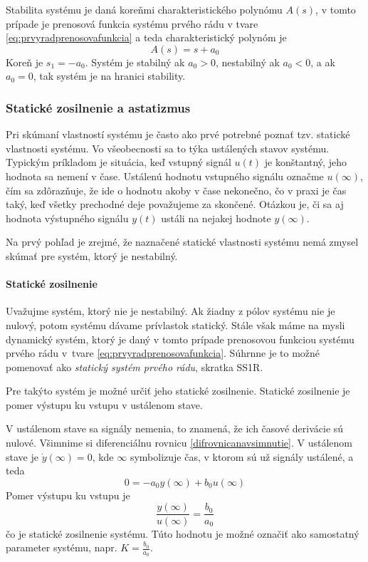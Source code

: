 \documentclass[a4paper, 10pt, ]{article}
\begin{document}
\bigskip

Stabilita systému je daná koreňmi charakteristického polynómu $A(s)$, v tomto prípade je prenosová funkcia systému prvého rádu v tvare \eqref{eq:prvyradprenosovafunkcia} a teda charakteristický polynóm je
\begin{equation}
    A(s) = s + a_0
\end{equation}
Koreň je $s_1 = -a_0$. Systém je stabilný ak $a_0 > 0$, nestabilný ak $a_0 < 0$, a ak $a_0 = 0$, tak systém je na hranici stability.




\subsubsection{Statické zosilnenie a astatizmus}

Pri skúmaní vlastností systému je často ako prvé potrebné poznať tzv. statické vlastnosti systému. Vo všeobecnosti sa to týka ustálených stavov systému. Typickým príkladom je situácia, keď vstupný signál $u(t)$ je konštantný, jeho hodnota sa nemení v čase. Ustálenú hodnotu vstupného signálu označme $u(\infty)$, čím sa zdôrazňuje, že ide o hodnotu akoby v čase nekonečno, čo v praxi je čas taký, keď všetky prechodné deje považujeme za skončené. Otázkou je, či sa aj hodnota výstupného signálu $y(t)$ ustáli na nejakej hodnote $y(\infty)$. 

Na prvý pohľad je zrejmé, že naznačené statické vlastnosti systému nemá zmysel skúmať pre systém, ktorý je nestabilný.



\paragraph{Statické zosilnenie}

Uvažujme systém, ktorý nie je nestabilný. Ak žiadny z pólov systému nie je nulový, potom systému dávame prívlastok statický. Stále však máme na mysli dynamický systém, ktorý je daný v tomto prípade prenosovou funkciou systému prvého rádu v~tvare \eqref{eq:prvyradprenosovafunkcia}. Súhrnne je to možné pomenovať ako \emph{statický systém prvého rádu}, skratka SS1R.

Pre takýto systém je možné určiť jeho statické zosilnenie. Statické zosilnenie je pomer výstupu ku vstupu v ustálenom stave.

V ustálenom stave sa signály nemenia, to znamená, že ich časové derivácie sú nulové. Všimnime si diferenciálnu rovnicu \eqref{difrovnicanavsimnutie}. V ustálenom stave je $\dot y(\infty) = 0$, kde $\infty$ symbolizuje čas, v ktorom sú už signály ustálené, a teda
\begin{equation}
    0 = -a_0 y(\infty) + b_0 u(\infty)
\end{equation}
Pomer výstupu ku vstupu je
\begin{equation}
    \frac{y(\infty)}{u(\infty)} = \frac{b_0}{a_0}
\end{equation}
čo je statické zosilnenie systému. Túto hodnotu je možné označiť ako samostatný parameter systému, napr. $K = \frac{b_0}{a_0}$.
\end{document}

